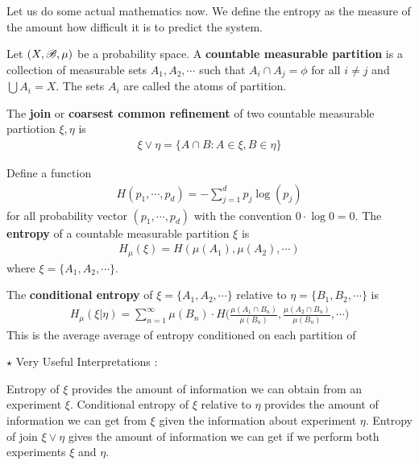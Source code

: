 \documentclass[12pt,a4paper]{report}
\begin{document}
Let us do some actual mathematics now. We define the entropy as the measure of the amount how difficult it is to predict the system.
\s

 Let $(X,\mathscr{B}, \mu)$ be a probability space. A \textbf{countable measurable partition} is a collection of measurable sets $A_1, A_2, \cdots$ such that $A_i \cap A_j =\phi$ for all $i\neq j$ and $\bigcup A_i = X$. The sets $A_i$ are called the atoms of partition. 

\quad The \textbf{join} or \textbf{coarsest common refinement} of two countable measurable partiotion $\xi, \eta$ is
\begin{align*}
\xi \vee \eta = \{A \cap B : A\in \xi, B \in \eta \}
\end{align*}

\quad Define a function
\begin{align*}
H(p_1, \cdots, p_d) = - \sum_{j=1}^d p_j \log (p_j)
\end{align*}
for all probability vector $(p_1, \cdots, p_d)$ with the convention $0 \cdot \log 0 =0$. The \textbf{entropy} of a countable measurable partition $\xi$ is
\begin{align*}
H_{\mu}(\xi) = H(\mu(A_1), \mu(A_2), \cdots)
\end{align*}
where $\xi = \{A_1, A_2, \cdots \}$.

\quad The \textbf{conditional entropy} of $\xi = \{A_1, A_2, \cdots \}$ relative to $\eta = \{B_1, B_2, \cdots \}$ is 
\begin{align*}
H_{\mu} (\xi | \eta) = \sum_{n=1}^{\infty} \mu(B_n) \cdot H\Big( \frac{\mu(A_1 \cap B_n)}{\mu(B_n)},\frac{\mu(A_2 \cap B_n)}{\mu(B_n)},\cdots \Big)
\end{align*}
This is the average average of entropy conditioned on each partition of 
\s

$\star$ Very Useful Interpretations : 

\quad Entropy of $\xi$ provides the amount of information we can obtain from an experiment $\xi$. Conditional entropy of $\xi$ relative to $\eta$ provides the amount of information we can get from $\xi$ given the information about experiment $\eta$. Entropy of join $\xi \vee \eta$ gives the amount of information we can get if we perform both experiments $\xi$ and $\eta$.
\s
\end{document}
